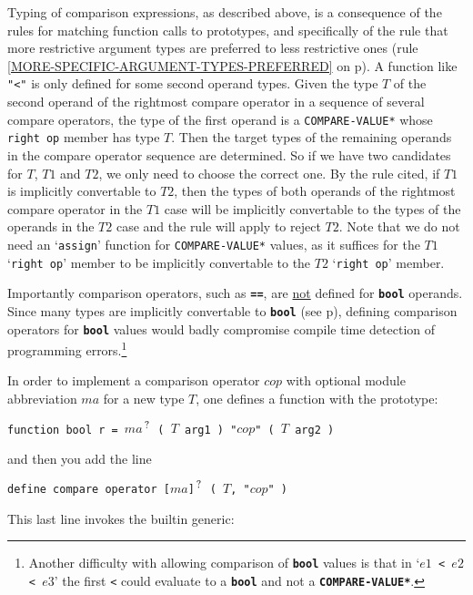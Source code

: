 \documentclass[12pt]{article}
\newcommand{\TT}[1]{{\tt \bfseries #1}}
\newcommand{\pagref}[1]{p\pageref{#1}}
\newcommand{\QMARK}{{$^{\,\mbox{\footnotesize ?}}$}}
\begin{document}
Typing of comparison expressions, as described above, is a
consequence of the rules for matching function calls to
prototypes, and specifically of the rule that more restrictive
argument types are preferred to less restrictive ones
(rule \ref{MORE-SPECIFIC-ARGUMENT-TYPES-PREFERRED} on
\pagref{MORE-SPECIFIC-ARGUMENT-TYPES-PREFERRED}).
A function like {\tt "<"} is only defined for
some second operand types.  Given the type $T$ of the second operand
of the rightmost compare operator in a sequence of several compare operators,
the type of the first operand is a {\tt *COMPARE-VALUE*}
whose {\tt right op} member has type $T$.  Then the target types
of the remaining operands in the compare operator sequence are determined.
So if we have two candidates
for $T$, $T1$ and $T2$, we only need to choose the correct one.
By the rule cited, if $T1$ is implicitly convertable to $T2$, then
the types of both operands of the rightmost compare operator
in the $T1$ case will be
implicitly convertable to the types of the operands in the $T2$ case
and the rule will apply to reject $T2$.  Note that we do not need
an `{\tt assign}' function for {\tt *COMPARE-VALUE*}
values, as it suffices for the $T1$ `{\tt right op}' member to be
implicitly convertable to the $T2$ `{\tt right op}' member.

Importantly comparison operators, such as \TT{==}, are
\underline{not} defined for \TT{bool} operands.  Since many
types are implicitly convertable to \TT{bool}
(see \pagref{IMPLIED-BOOL-CONVERSION}), defining comparison
operators for \TT{bool} values would badly compromise compile time
detection of programming errors.\footnote{Another difficulty
with allowing comparison of \TT{bool} values is that in
`{\tt $e1$ < $e2$ < $e3$}' the first {\tt <} could evaluate
to a \TT{bool} and not a \TT{*COMPARE-VALUE*}.}

In order to implement a comparison operator $cop$ with optional
module abbreviation $ma$ for a new
type $T$, one defines a function with the prototype:
\begin{center}
\tt function bool r = $ma$\QMARK{} ( $T$ arg1 ) "$cop$" ( $T$ arg2 )
\end{center}
and then you add the line
\begin{center}
\tt define compare operator [$ma$]\QMARK{} ( $T$, "$cop$" )
\end{center}
This last line invokes the builtin generic:
\end{document}
